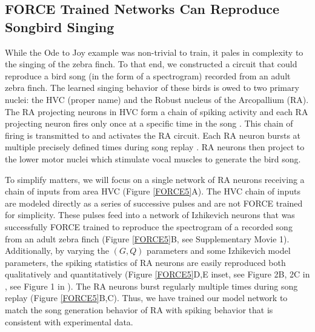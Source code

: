\documentclass[11pt]{article} %
\begin{document}

\subsection*{FORCE Trained Networks Can Reproduce Songbird Singing} 

While the Ode to Joy example was non-trivial to train, it pales in complexity to the singing of the zebra finch.  To that end, we constructed a circuit that could reproduce a bird song (in the form of a spectrogram) recorded from an adult zebra finch.   The learned singing behavior of these birds is owed to two primary nuclei: the HVC (proper name) and the Robust nucleus of the Arcopallium (RA).   The RA projecting neurons in HVC form a chain of spiking activity and each RA projecting neuron fires only once at a specific time in the song \cite{Fee3,Hanloser}.  This chain of firing is transmitted to and activates the RA circuit.   Each RA neuron bursts at multiple precisely defined times during song replay \cite{Fee2}.  RA neurons then project to the lower motor nuclei which stimulate vocal muscles to generate the bird song.

To simplify matters, we will focus on a single network of RA neurons receiving a chain of inputs from area HVC (Figure \ref{FORCE5}A).   The HVC chain of inputs are modeled directly as a series of successive pulses and are not FORCE trained for simplicity.  These pulses feed into a network of Izhikevich neurons that was successfully FORCE trained to reproduce the spectrogram of a recorded song from an adult zebra finch (Figure \ref{FORCE5}B, see Supplementary Movie 1).  Additionally, by varying the $(G,Q)$ parameters and some Izhikevich model parameters, the spiking statistics of RA neurons are easily reproduced both qualitatively and quantitatively (Figure \ref{FORCE5}D,E inset, see Figure 2B, 2C in \cite{Fee2}, see Figure 1 in \cite{Fee2}).   The RA neurons burst regularly multiple times during song replay (Figure \ref{FORCE5}B,C).  Thus, we have trained our model network to match the song generation behavior of RA with spiking behavior that is consistent with experimental data.  
\end{document}
